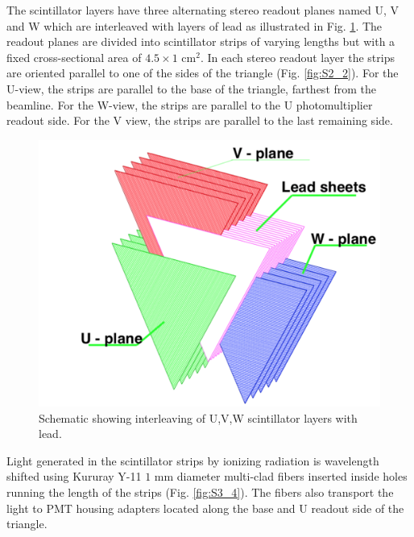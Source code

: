 The scintillator layers have three alternating stereo readout planes named U, V and W which are interleaved with layers of lead as illustrated in Fig. \ref{fig:S3_2}. The readout planes are divided into scintillator strips of varying lengths but with a fixed cross-sectional area of $4.5 \times 1$ cm$^2$. In each stereo readout layer the strips are oriented parallel to one of the sides of the triangle (Fig. \ref{fig:S2_2}). For the U-view, the strips are parallel to the base of the triangle, farthest from the beamline. For the W-view, the strips are parallel to the U photomultiplier readout side.  For the V view, the strips are parallel to the last remaining side.  

\begin{figure}[hbt]
\centering
\includegraphics[width=0.95\columnwidth,keepaspectratio]{img/S3_2.png}
\caption[PCAL UVW Layers]{Schematic showing interleaving of U,V,W scintillator layers with lead. }
\label{fig:S3_2}
\end{figure}

Light generated in the scintillator strips by ionizing radiation is wavelength shifted using Kururay Y-11 $1$ mm diameter multi-clad fibers inserted inside holes running the length of the strips (Fig. \ref{fig:S3_4}). The fibers also transport the light to PMT housing adapters located along the base and U readout side of the triangle.

